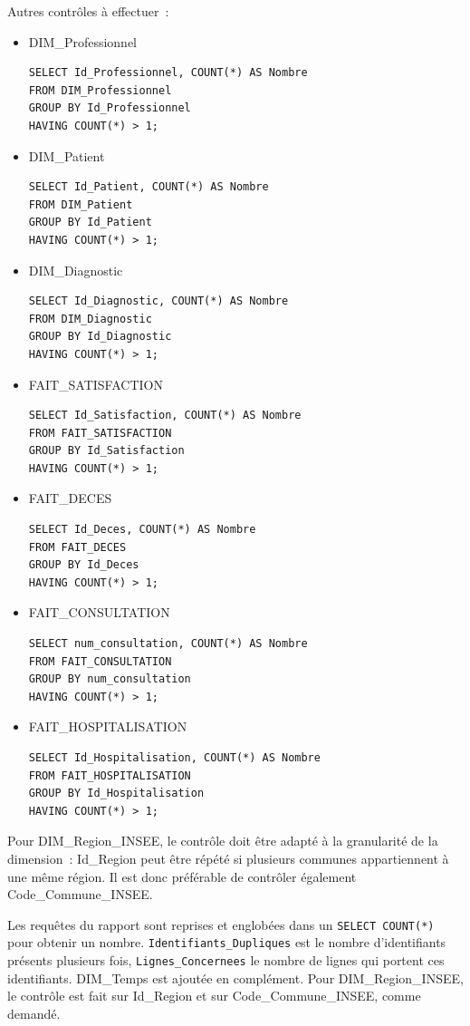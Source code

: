 \noindent Autres contrôles à effectuer~:
\begin{itemize}
	\item DIM\_Professionnel
\begin{verbatim}
SELECT Id_Professionnel, COUNT(*) AS Nombre
FROM DIM_Professionnel
GROUP BY Id_Professionnel
HAVING COUNT(*) > 1;
\end{verbatim}
	\item DIM\_Patient
\begin{verbatim}
SELECT Id_Patient, COUNT(*) AS Nombre
FROM DIM_Patient
GROUP BY Id_Patient
HAVING COUNT(*) > 1;
\end{verbatim}
	\item DIM\_Diagnostic
\begin{verbatim}
SELECT Id_Diagnostic, COUNT(*) AS Nombre
FROM DIM_Diagnostic
GROUP BY Id_Diagnostic
HAVING COUNT(*) > 1;
\end{verbatim}
	\item FAIT\_SATISFACTION
\begin{verbatim}
SELECT Id_Satisfaction, COUNT(*) AS Nombre
FROM FAIT_SATISFACTION
GROUP BY Id_Satisfaction
HAVING COUNT(*) > 1;
\end{verbatim}
	\item FAIT\_DECES
\begin{verbatim}
SELECT Id_Deces, COUNT(*) AS Nombre
FROM FAIT_DECES
GROUP BY Id_Deces
HAVING COUNT(*) > 1;
\end{verbatim}
	\item FAIT\_CONSULTATION
\begin{verbatim}
SELECT num_consultation, COUNT(*) AS Nombre
FROM FAIT_CONSULTATION
GROUP BY num_consultation
HAVING COUNT(*) > 1;
\end{verbatim}
	\item FAIT\_HOSPITALISATION
\begin{verbatim}
SELECT Id_Hospitalisation, COUNT(*) AS Nombre
FROM FAIT_HOSPITALISATION
GROUP BY Id_Hospitalisation
HAVING COUNT(*) > 1;
\end{verbatim}
\end{itemize}

\noindent Pour DIM\_Region\_INSEE, le contrôle doit être adapté à la granularité de la dimension~: Id\_Region peut être répété si plusieurs communes appartiennent à une même région. Il est donc préférable de contrôler également Code\_Commune\_INSEE.

\noindent Les requêtes du rapport sont reprises et englobées dans un \texttt{SELECT COUNT(*)} pour obtenir un nombre. \texttt{Identifiants\_Dupliques} est le nombre d'identifiants présents plusieurs fois, \texttt{Lignes\_Concernees} le nombre de lignes qui portent ces identifiants. DIM\_Temps est ajoutée en complément. Pour DIM\_Region\_INSEE, le contrôle est fait sur Id\_Region et sur Code\_Commune\_INSEE, comme demandé.

